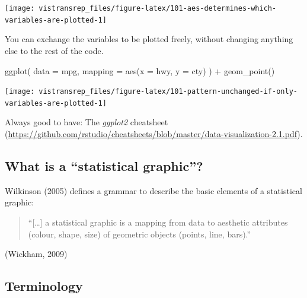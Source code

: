\documentclass[]{book}
\newenvironment{Shaded}{}{}
\newcommand{\DataTypeTok}[1]{#1}
\newcommand{\KeywordTok}[1]{\textcolor[rgb]{0.00,0.00,1.00}{#1}}
\newcommand{\NormalTok}[1]{#1}
\newcommand{\OperatorTok}[1]{#1}
\newcommand{\StringTok}[1]{\textcolor[rgb]{0.00,0.50,0.50}{#1}}
\begin{document}
\begin{flushright}\texttt{[image: vistransrep\_files/figure-latex/101-aes-determines-which-variables-are-plotted-1]} \end{flushright}

You can exchange the variables to be plotted freely, without changing anything else to the rest of the code.

\begin{Shaded}
\begin{Highlighting}[]
\KeywordTok{ggplot}\NormalTok{(}
  \DataTypeTok{data =}\NormalTok{ mpg,}
  \DataTypeTok{mapping =} \KeywordTok{aes}\NormalTok{(}\DataTypeTok{x =}\NormalTok{ hwy, }\DataTypeTok{y =}\NormalTok{ cty)}
\NormalTok{) }\OperatorTok{+}
\StringTok{  }\KeywordTok{geom_point}\NormalTok{()}
\end{Highlighting}
\end{Shaded}

\begin{flushright}\texttt{[image: vistransrep\_files/figure-latex/101-pattern-unchanged-if-only-variables-are-plotted-1]} \end{flushright}

Always good to have: The \emph{ggplot2} cheatsheet (\url{https://github.com/rstudio/cheatsheets/blob/master/data-visualization-2.1.pdf}).

\hypertarget{what-is-a-statistical-graphic}{%
\subsection{What is a ``statistical graphic''?}\label{what-is-a-statistical-graphic}}

Wilkinson (2005) defines a grammar to describe the basic elements of a
statistical graphic:

\begin{quote}
``{[}\ldots{}{]} a statistical graphic is a mapping from data to
aesthetic attributes (colour, shape, size) of geometric objects
(points, line, bars).''
\end{quote}

\hfill (Wickham, 2009)

\hypertarget{terminology}{%
\subsection{Terminology}\label{terminology}}
\end{document}

